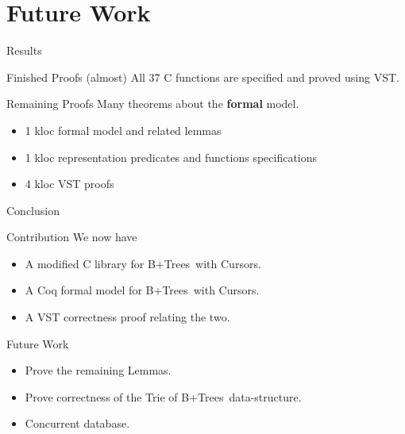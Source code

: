 \documentclass[page number,usenames,dvipsnames]{beamer}
\def\btrees{B+Trees}
\begin{document}
\section{Future Work}
\begin{frame}{Results}

  \begin{exampleblock}{Finished Proofs}
    {\color{Gray}(almost)} All 37 C functions are specified and proved using VST.
  \end{exampleblock}
  \vfill
  \begin{alertblock}{Remaining Proofs}
    Many theorems about the \textbf{formal} model.
  \end{alertblock}
  \vfill
  \begin{itemize}
  \item 1 kloc formal model and related lemmas
  \item 1 kloc representation predicates and functions specifications
  \item 4 kloc VST proofs
  \end{itemize}
  
\end{frame}

\begin{frame}{Conclusion}
  \begin{block}{Contribution}
    We now have
    \begin{itemize}
    \item A modified C library for \btrees\ with Cursors.
    \item A Coq formal model for \btrees\ with Cursors.
    \item A VST correctness proof relating the two.
    \end{itemize}
  \end{block}
  \vfill
  \begin{block}{Future Work}
    \begin{itemize}
    \item Prove the remaining Lemmas.
    \item Prove correctness of the Trie of \btrees\ data-structure.
    \item Concurrent database.
    \end{itemize}
  \end{block}
  
\end{frame}
\end{document}
